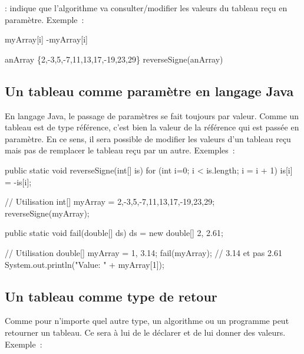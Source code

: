 		\In\Out : indique que l’algorithme va consulter/modifier les valeurs du
		tableau reçu en paramètre. Exemple~:
			
		\begin{pseudocode}
					\Let myArray[i] \Gets -myArray[i]
				\EndFor
			\EndAlgo 

			\Empty
			\Let anArray \Gets	
				{}
				\{2,-3,5,-7,11,13,17,-19,23,29\}
			\Stmt reverseSigne(anArray)
		\end{pseudocode}


		\subsection{Un tableau comme paramètre en langage Java}

		En langage Java, le passage de paramètres se fait toujours par valeur.
		Comme un tableau est de type référence, c'est bien la valeur de la
		référence qui est passée en paramètre. En ce sens, il sera possible de
		modifier les valeurs d'un tableau reçu mais pas de remplacer le tableau
		reçu par un autre. Exemples~:

\begin{java}
	public static void reverseSigne(int[] is){
		for (int i=0; i < is.length; i = i + 1){
			is[i] = -is[i];
		}
	}

	// Utilisation
	int[] myArray = {2,-3,5,-7,11,13,17,-19,23,29};
	reverseSigne(myArray);
\end{java}

\begin{java}
	public static void fail(double[] ds){
		ds = new double[] {2, 2.61};
	}


	// Utilisation
	double[] myArray = {1, 3.14};
	fail(myArray);
	// 3.14 et pas 2.61
	System.out.println("Value: " + myArray[1]);		

\end{java}



		\subsection{Un tableau comme type de retour}

		Comme pour n’importe quel autre type, un algorithme ou un programme peut
		retourner un tableau.  Ce sera à lui de le déclarer et de lui donner des
		valeurs.  Exemple~:
			

